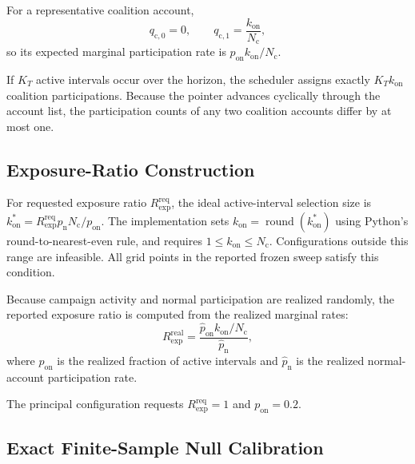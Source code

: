 For a representative coalition account,
\[
q_{\mathrm c,0}=0,
\qquad
q_{\mathrm c,1}
=
\frac{k_{\mathrm{on}}}{N_{\mathrm c}},
\]
so its expected marginal participation rate is
$p_{\mathrm{on}}k_{\mathrm{on}}/N_{\mathrm c}$.

If $K_T$ active intervals occur over the horizon, the scheduler assigns
exactly $K_Tk_{\mathrm{on}}$ coalition participations. Because the pointer
advances cyclically through the account list, the participation counts of any
two coalition accounts differ by at most one.



\subsection{Exposure-Ratio Construction}
\label{sec:supp-rotation-ratio}

For requested exposure ratio $R_{\mathrm{exp}}^{\mathrm{req}}$, the ideal
active-interval selection size is
$k_{\mathrm{on}}^{*}
=
R_{\mathrm{exp}}^{\mathrm{req}}p_{\mathrm n}N_{\mathrm c}/p_{\mathrm{on}}$.
The implementation sets
$k_{\mathrm{on}}=\operatorname{round}(k_{\mathrm{on}}^{*})$
using Python's round-to-nearest-even rule, and requires
$1\leq k_{\mathrm{on}}\leq N_{\mathrm c}$. Configurations outside this range
are infeasible. All grid points in the reported frozen sweep satisfy this
condition.

Because campaign activity and normal participation are realized randomly,
the reported exposure ratio is computed from the realized marginal rates:
\begin{equation}
\label{eq:supp-realized-rexp}
R_{\mathrm{exp}}^{\mathrm{real}}
=
\frac{
\widehat p_{\mathrm{on}}k_{\mathrm{on}}/N_{\mathrm c}
}{
\widehat p_{\mathrm n}
},
\end{equation}
where $\widehat p_{\mathrm{on}}$ is the realized fraction of active intervals
and $\widehat p_{\mathrm n}$ is the realized normal-account participation
rate.

The principal configuration requests
$R_{\mathrm{exp}}^{\mathrm{req}}=1$ and $p_{\mathrm{on}}=0.2$.



\subsection{Exact Finite-Sample Null Calibration}
\label{sec:supp-rotation-calibration}


